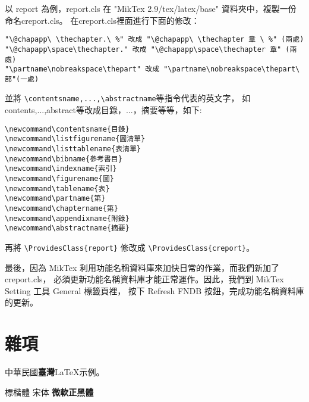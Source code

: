 \documentclass{creport}
\begin{document}
以 report 為例，report.cls 在 "MikTex 2.9/tex/latex/base" 資料夾中，複製一份命名creport.cls。
在creport.cls裡面進行下面的修改：
\begin{verbatim}
"\@chapapp\ \thechapter.\ %" 改成 "\@chapapp\ \thechapter 章 \ %" (兩處)
"\@chapapp\space\thechapter." 改成 "\@chapapp\space\thechapter 章" (兩處)
"\partname\nobreakspace\thepart" 改成 "\partname\nobreakspace\thepart\ 部"(一處)
\end{verbatim}
並將 \verb+\contentsname,...,\abstractname+等指令代表的英文字，
如contents,...,abstract等改成目錄，...，摘要等等，如下:
\begin{verbatim}
\newcommand\contentsname{目錄}
\newcommand\listfigurename{圖清單}
\newcommand\listtablename{表清單}
\newcommand\bibname{參考書目}
\newcommand\indexname{索引}
\newcommand\figurename{圖}
\newcommand\tablename{表}
\newcommand\partname{第}
\newcommand\chaptername{第}
\newcommand\appendixname{附錄}
\newcommand\abstractname{摘要}
\end{verbatim}
再將 \verb+\ProvidesClass{report}+ 修改成 \verb+\ProvidesClass{creport}+。

最後，因為 MikTex 利用功能名稱資料庫來加快日常的作業，而我們新加了creport.cls，
必須更新功能名稱資料庫才能正常運作。因此，我們到 MikTex Setting 工具 General 標籤頁裡，
按下 Refresh FNDB 按鈕，完成功能名稱資料庫的更新。

 
\chapter{雜項}
中華民國\textbf{臺灣}\LaTeX \textsf{示例}。

\kai 標楷體 \song 宋体 \hei \textbf{微軟正黑體}
\nocite{*}


\end{document}
